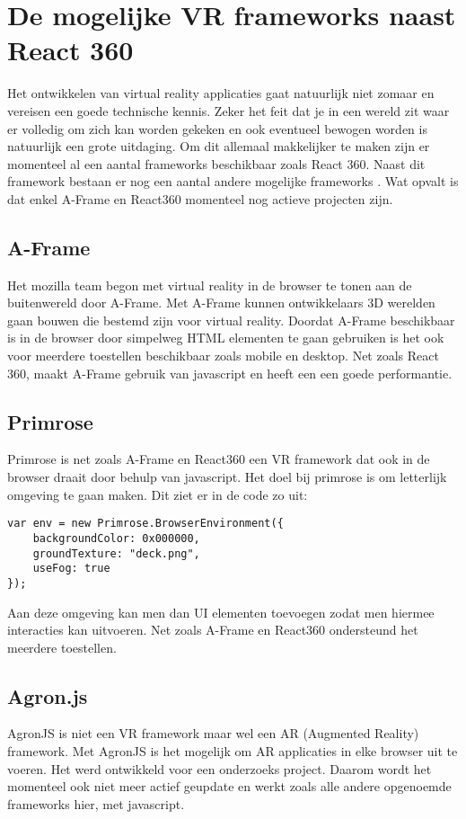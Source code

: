 \section{De mogelijke VR frameworks naast React 360}
\label{sec:frameworks-alternatieven}
Het ontwikkelen van virtual reality applicaties gaat natuurlijk niet zomaar en vereisen een goede technische kennis. Zeker het feit dat je in een wereld zit waar er volledig om zich kan worden gekeken en ook eventueel bewogen worden is natuurlijk een grote uitdaging. Om dit allemaal makkelijker te maken zijn er momenteel al een aantal frameworks beschikbaar zoals React 360. Naast dit framework bestaan er nog een aantal andere mogelijke frameworks \autocite{UIUXLab2017}. Wat opvalt is dat enkel A-Frame en React360 momenteel nog actieve projecten zijn. 

\subsection{A-Frame}
\label{subsec:a-frame}
Het mozilla team begon met virtual reality in de browser te tonen aan de buitenwereld door A-Frame. Met A-Frame kunnen ontwikkelaars 3D werelden gaan bouwen die bestemd zijn voor virtual reality. Doordat A-Frame beschikbaar is in de browser door simpelweg HTML elementen te gaan gebruiken is het ook voor meerdere toestellen beschikbaar zoals mobile en desktop. Net zoals React 360, maakt A-Frame gebruik van javascript en heeft een een goede performantie.
 
\subsection{Primrose}
\label{subsec:primrose}
Primrose is net zoals A-Frame en React360 een VR framework dat ook in de browser draait door behulp van javascript. Het doel bij primrose is om letterlijk omgeving te gaan maken. Dit ziet er in de code zo uit:

\begin{lstlisting}[frame=single, caption=Voorbeeld van primrose omgeving]
var env = new Primrose.BrowserEnvironment({
	backgroundColor: 0x000000,
	groundTexture: "deck.png",
	useFog: true
});
\end{lstlisting}

Aan deze omgeving kan men dan UI elementen toevoegen zodat men hiermee interacties kan uitvoeren. Net zoals A-Frame en React360 ondersteund het meerdere toestellen.

\subsection{Agron.js}
\label{subsec:agron.js}
AgronJS is niet een VR framework maar wel een AR (Augmented Reality) framework. Met AgronJS is het mogelijk om AR applicaties in elke browser uit te voeren. Het werd ontwikkeld voor een onderzoeks project. Daarom wordt het momenteel ook niet meer actief geupdate en werkt zoals alle andere opgenoemde frameworks hier, met javascript.



